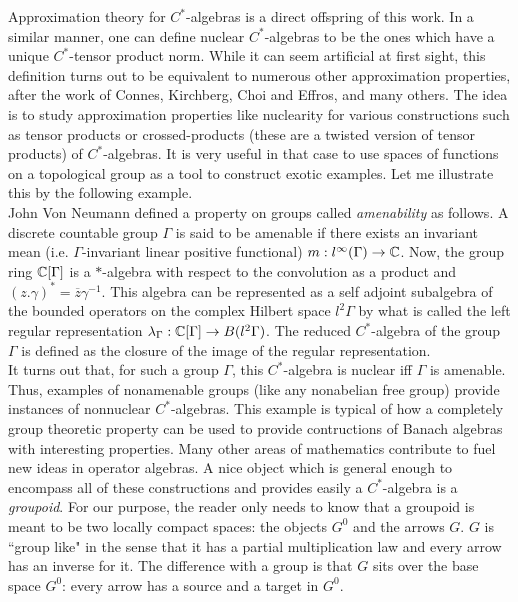 Approximation theory for $C^*$-algebras is a direct offspring of this work. In a similar manner, one can define nuclear $C^*$-algebras to be the ones which have a unique $C^*$-tensor product norm. While it can seem artificial at first sight, this definition turns out to be equivalent to numerous other approximation properties, after the work of Connes, Kirchberg, Choi and Effros, and many others. The idea is to study approximation properties like nuclearity for various constructions such as tensor products or crossed-products (these are a twisted version of tensor products) of $C^*$-algebras. It is very useful in that case to use spaces of functions on a topological group as a tool to construct exotic examples. Let me illustrate this by the following example.\\

John Von Neumann defined a property on groups called \textit{amenability} as follows. A discrete countable group $\Gamma$ is said to be amenable if there exists an invariant mean (i.e. $\Gamma$-invariant linear positive functional) $m: l^\infty(\Gamma)\rightarrow \mathbb{C}$. Now, the group ring $\mathbb{C}[\Gamma]$ is a $*$-algebra with respect to the convolution as a product and $(z. \gamma)^* = \overline{z}\gamma^{-1}$. This algebra can be represented as a self adjoint subalgebra of the bounded operators on the complex Hilbert space $l^2\Gamma$ by what is called the left regular representation $\lambda_\Gamma: \mathbb{C}[\Gamma]\rightarrow B(l^2\Gamma)$. The reduced $C^*$-algebra of the group $\Gamma$ is defined as the closure of the image of the regular representation.\\

It turns out that, for such a group $\Gamma$, this $C^*$-algebra is nuclear iff $\Gamma$ is amenable. Thus, examples of nonamenable groups (like any nonabelian free group) provide instances of nonnuclear $C^*$-algebras. This example is typical of how a completely group theoretic property can be used to provide contructions of Banach algebras with interesting properties. Many other areas of mathematics contribute to fuel new ideas in operator algebras. A nice object which is general enough to encompass all of these constructions and provides easily a $C^*$-algebra is a \textit{groupoid}. For our purpose, the reader only needs to know that a groupoid is meant to be two locally compact spaces: the objects $G^0$ and the arrows $G$. $G$ is ``group like" in the sense that it has a partial multiplication law and every arrow has an inverse for it. The difference with a group is that $G$ sits over the base space $G^0$: every arrow has a source and a target in $G^0$.\\  

